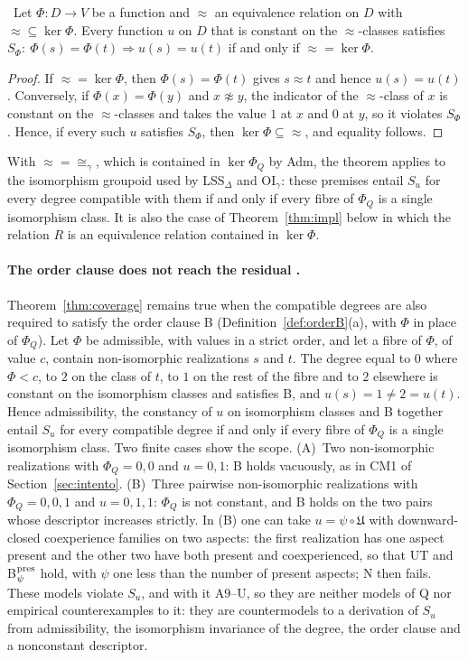 \begin{theorem}\label{thm:coverage}
\stA\ Let $\Phi:D\to V$ be a function and $\approx$ an equivalence relation on $D$ with ${\approx}\subseteq\ker\Phi$. Every function $u$ on $D$ that is constant on the $\approx$-classes satisfies $S_\Phi:\ \Phi(s)=\Phi(t)\Rightarrow u(s)=u(t)$ if and only if ${\approx}=\ker\Phi$.
\end{theorem}
\begin{proof}
If ${\approx}=\ker\Phi$, then $\Phi(s)=\Phi(t)$ gives $s\approx t$ and hence $u(s)=u(t)$. Conversely, if $\Phi(x)=\Phi(y)$ and $x\not\approx y$, the indicator of the $\approx$-class of $x$ is constant on the $\approx$-classes and takes the value $1$ at $x$ and $0$ at $y$, so it violates $S_\Phi$. Hence, if every such $u$ satisfies $S_\Phi$, then $\ker\Phi\subseteq{\approx}$, and equality follows.
\end{proof}
With ${\approx}={\cong_\gamma}$, which is contained in $\ker\Phi_Q$ by Adm, the theorem applies to the isomorphism groupoid used by LSS$_\Delta$ and OI$_\gamma$: these premises entail $S_u$ for every degree compatible with them if and only if every fibre of $\Phi_Q$ is a single isomorphism class. It is also the case of Theorem~\ref{thm:impl} below in which the relation $R$ is an equivalence relation contained in $\ker\Phi$.

\paragraph{The order clause does not reach the residual \stA.} Theorem~\ref{thm:coverage} remains true when the compatible degrees are also required to satisfy the order clause B (Definition~\ref{def:orderB}(a), with $\Phi$ in place of $\Phi_Q$). Let $\Phi$ be admissible, with values in a strict order, and let a fibre of $\Phi$, of value $c$, contain non-isomorphic realizations $s$ and $t$. The degree equal to $0$ where $\Phi<c$, to $2$ on the class of $t$, to $1$ on the rest of the fibre and to $2$ elsewhere is constant on the isomorphism classes and satisfies B, and $u(s)=1\ne2=u(t)$. Hence admissibility, the constancy of $u$ on isomorphism classes and B together entail $S_u$ for every compatible degree if and only if every fibre of $\Phi_Q$ is a single isomorphism class. Two finite cases show the scope. (A)~Two non-isomorphic realizations with $\Phi_Q=0,0$ and $u=0,1$: B holds vacuously, as in CM1 of Section~\ref{sec:intento}. (B)~Three pairwise non-isomorphic realizations with $\Phi_Q=0,0,1$ and $u=0,1,1$: $\Phi_Q$ is not constant, and B holds on the two pairs whose descriptor increases strictly. In (B) one can take $u=\psi\circ\mathfrak U$ with downward-closed coexperience families on two aspects: the first realization has one aspect present and the other two have both present and coexperienced, so that UT and B$_\psi^{\rm pres}$ hold, with $\psi$ one less than the number of present aspects; N then fails. These models violate $S_u$, and with it A9--U, so they are neither models of Q nor empirical counterexamples to it: they are countermodels to a derivation of $S_u$ from admissibility, the isomorphism invariance of the degree, the order clause and a nonconstant descriptor.

